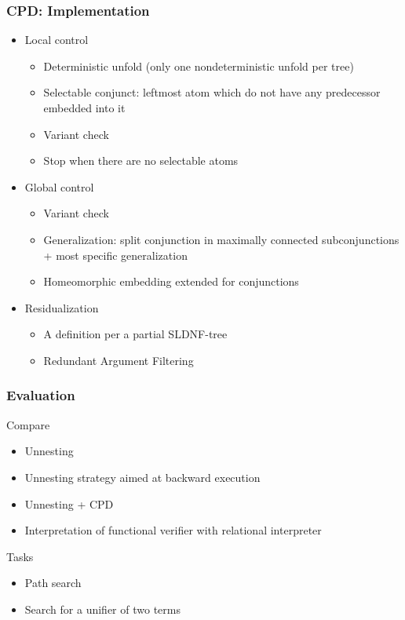 \documentclass[xcolor=table]{beamer}
\begin{document}
\begin{frame}[fragile]
  \transwipe[direction=90]
  \frametitle{CPD: Implementation}
\begin{itemize} 
  \item Local control
  \begin{itemize} 
    \item Deterministic unfold (only one nondeterministic unfold per tree) 
    \item Selectable conjunct: leftmost atom which do not have any predecessor embedded into it
    \item Variant check
    \item Stop when there are no selectable atoms
  \end{itemize}  
  \item Global control
  \begin{itemize}
    \item Variant check
    \item Generalization: split conjunction in maximally connected subconjunctions + most specific generalization
    \item Homeomorphic embedding extended for conjunctions
  \end{itemize} 
  \item Residualization
  \begin{itemize}
    \item A definition per a partial SLDNF-tree
    \item Redundant Argument Filtering
  \end{itemize} 
\end{itemize}   
\end{frame}

\begin{frame}[fragile]
  \transwipe[direction=90]
  \frametitle{Evaluation}
  Compare 
  
\begin{itemize}
  \item Unnesting 
  \item Unnesting strategy aimed at backward execution
  \item Unnesting + CPD
  \item Interpretation of functional verifier with relational interpreter
\end{itemize}

Tasks 

\begin{itemize}
  \item Path search
  \item Search for a unifier of two terms
\end{itemize}
  
\end{frame}
\end{document}
